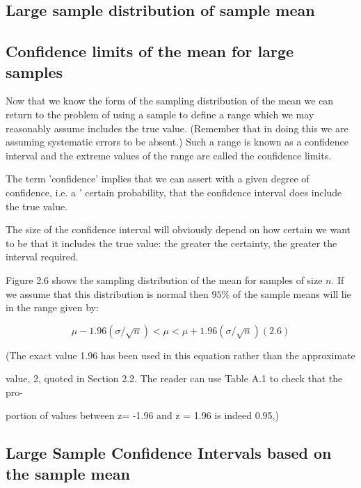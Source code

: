  

\subsection{Large sample distribution of sample mean}


 

\subsection{Confidence limits of the mean for large samples}

Now that we know the form of the sampling distribution of the mean we can return to the problem of using a sample to define a range which we may reasonably assume includes the true value. (Remember that in doing this we are assuming systematic errors to be absent.) Such a range is known as a confidence interval and the extreme values of the range are called the confidence limits.

 

The term 'confidence' implies that we can assert with a given degree of confidence, i.e. a ' certain probability, that the confidence interval does include the true value.

 

The size of the confidence interval will obviously depend on how certain we want to be that it includes the true value: the greater the certainty, the greater the interval required.

 

Figure 2.6 shows the sampling distribution of the mean for samples of size $n$. If we assume that this distribution is normal then $95\%$  of the sample means will lie in the range given by:

\[ \mu - 1.96(\sigma/\sqrt{n}) < \mu < \mu + 1.96(\sigma/\sqrt{n}) (2.6)\]

 

(The exact value 1.96 has been used in this equation rather than the approximate

value, 2, quoted in Section 2.2. The reader can use Table A.1 to check that the pro-

portion of values between z= -1.96 and z = 1.96 is indeed 0.95,)

 

\subsection{Large Sample Confidence Intervals based on the sample mean}


